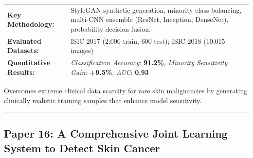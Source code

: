 \documentclass[10pt,a4paper]{article}
\begin{document}
\vspace{4pt}
\begin{tabularx}{\linewidth}{p{3.2cm}X}
\toprule
\textbf{Key Methodology:} & StyleGAN synthetic generation, minority class balancing, multi-CNN ensemble (ResNet, Inception, DenseNet), probability decision fusion. \\
\textbf{Evaluated Datasets:} & ISIC 2017 (2,000 train, 600 test); ISIC 2018 (10,015 images) \\
\textbf{Quantitative Results:} & \textit{Classification Accuracy}: \textbf{91.2\%}, \textit{Minority Sensitivity Gain}: \textbf{+9.5\%}, \textit{AUC}: \textbf{0.93} \\
\bottomrule
\end{tabularx}
\vspace{4pt}
\begin{tcolorbox}[utilitybox,title=Clinical Utility and Real-World Impact]
Overcomes extreme clinical data scarcity for rare skin malignancies by generating clinically realistic training samples that enhance model sensitivity.
\end{tcolorbox}
\vspace{12pt}
\hrule
\vspace{12pt}
\subsection*{Paper 16: A Comprehensive Joint Learning System to Detect Skin Cancer}
\end{document}

